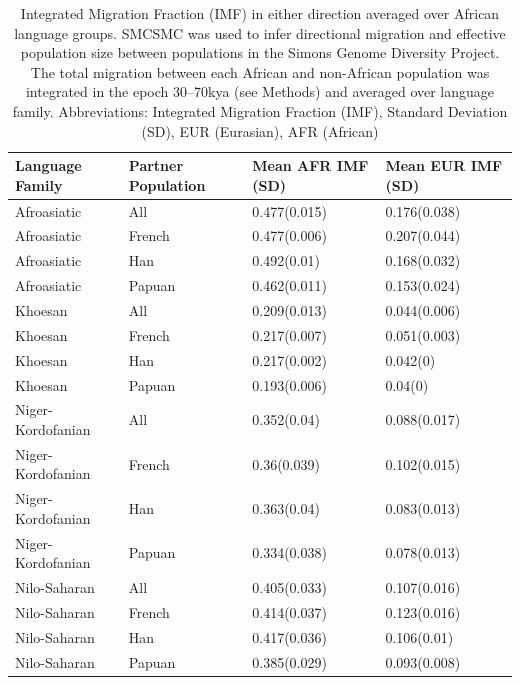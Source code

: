 \begin{table}[ht]
\centering
\begin{tabular}{llll}
  \hline
Language Family & Partner Population & Mean AFR IMF (SD) & Mean EUR IMF (SD) \\ 
  \hline
Afroasiatic & All & 0.477(0.015) & 0.176(0.038) \\ 
  Afroasiatic & French & 0.477(0.006) & 0.207(0.044) \\ 
  Afroasiatic & Han & 0.492(0.01) & 0.168(0.032) \\ 
  Afroasiatic & Papuan & 0.462(0.011) & 0.153(0.024) \\ 
  Khoesan & All & 0.209(0.013) & 0.044(0.006) \\ 
  Khoesan & French & 0.217(0.007) & 0.051(0.003) \\ 
  Khoesan & Han & 0.217(0.002) & 0.042(0) \\ 
  Khoesan & Papuan & 0.193(0.006) & 0.04(0) \\ 
  Niger-Kordofanian & All & 0.352(0.04) & 0.088(0.017) \\ 
  Niger-Kordofanian & French & 0.36(0.039) & 0.102(0.015) \\ 
  Niger-Kordofanian & Han & 0.363(0.04) & 0.083(0.013) \\ 
  Niger-Kordofanian & Papuan & 0.334(0.038) & 0.078(0.013) \\ 
  Nilo-Saharan & All & 0.405(0.033) & 0.107(0.016) \\ 
  Nilo-Saharan & French & 0.414(0.037) & 0.123(0.016) \\ 
  Nilo-Saharan & Han & 0.417(0.036) & 0.106(0.01) \\ 
  Nilo-Saharan & Papuan & 0.385(0.029) & 0.093(0.008) \\ 
   \hline
\end{tabular}
\caption[Tests for difference between integrated migration fractions in the SGDP averaged over African language families]{Integrated Migration Fraction (IMF) in either direction averaged over African language groups. SMCSMC was used to infer directional migration and effective population size between populations in the Simons Genome Diversity Project. The total migration between each African and non-African population was integrated in the epoch 30--70kya (see Methods) and averaged over language family. Abbreviations: Integrated Migration Fraction (IMF), Standard Deviation (SD), EUR (Eurasian), AFR (African)} 
\label{table:average_sgdp_migration_table}
\end{table}

